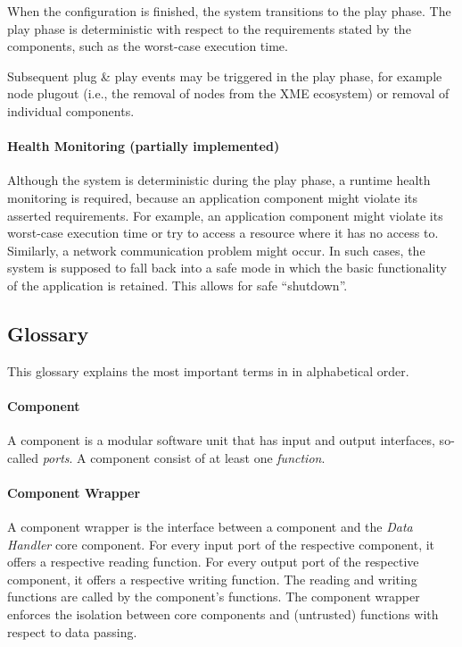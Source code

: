 When the configuration is finished, the system transitions to the play phase.
The play phase is deterministic with respect to the requirements stated by the components, such as the worst-case execution time.

Subsequent plug \& play events may be triggered in the play phase,
for example node plugout (i.e., the removal of nodes from the XME ecosystem)
or removal of individual components.

\paragraph{Health Monitoring (partially implemented)}

Although the system is deterministic during the play phase, a runtime health monitoring is required,
because an application component might violate its asserted requirements.
For example, an application component might violate its worst-case execution time or try to access a resource where it has no access to.
Similarly, a network communication problem might occur.
In such cases, the system is supposed to fall back into a safe mode in which the basic functionality of the application is retained.
This allows for safe ``shutdown''.

\subsection{Glossary}
\label{sec:architecture:glossary}

This glossary explains the most important terms in \xme in alphabetical order.

\paragraph{Component}
A component is a modular software unit that has input and output interfaces, so-called \emph{ports}.
A component consist of at least one \emph{function}.

\paragraph{Component Wrapper}
A component wrapper is the interface between a component and the \emph{Data Handler} core component.
For every input port of the respective component, it offers a respective reading function.
For every output port of the respective component, it offers a respective writing function.
The reading and writing functions are called by the component's functions.
The component wrapper enforces the isolation between \xme core components and (untrusted) functions with respect to data passing.

